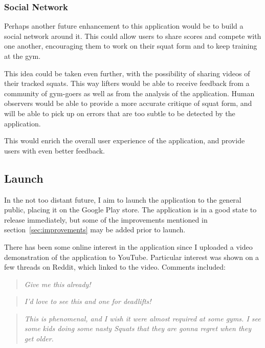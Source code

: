 \subsubsection{Social Network}

Perhaps another future enhancement to this application would be to build a social network around it. This could allow users to share scores and compete with one another, encouraging them to work on their squat form and to keep training at the gym.

This idea could be taken even further, with the possibility of sharing videos of their tracked squats. This way lifters would be able to receive feedback from a community of gym-goers as well as from the analysis of the application. Human observers would be able to provide a more accurate critique of squat form, and will be able to pick up on errors that are too subtle to be detected by the application.

This would enrich the overall user experience of the application, and provide users with even better feedback.

\subsection{Launch}

In the not too distant future, I aim to launch the application to the general public, placing it on the Google Play\cite{googleplay} store. The application is in a good state to release immediately, but some of the improvements mentioned in section~\ref{sec:improvements} may be added prior to launch.

There has been some online interest in the application since I uploaded a video demonstration of the application to YouTube\cite{youtube}. Particular interest was shown on a few threads on Reddit\cite{reddit}, which linked to the video. Comments included:

\begin{quote}
\emph{Give me this already!}
\end{quote}

\begin{quote}
\emph{I'd love to see this and one for deadlifts!}
\end{quote}

\begin{quote}
\emph{This is phenomenal, and I wish it were almost required at some gyms. I see some kids doing some nasty Squats that they are gonna regret when they get older.}
\end{quote}

